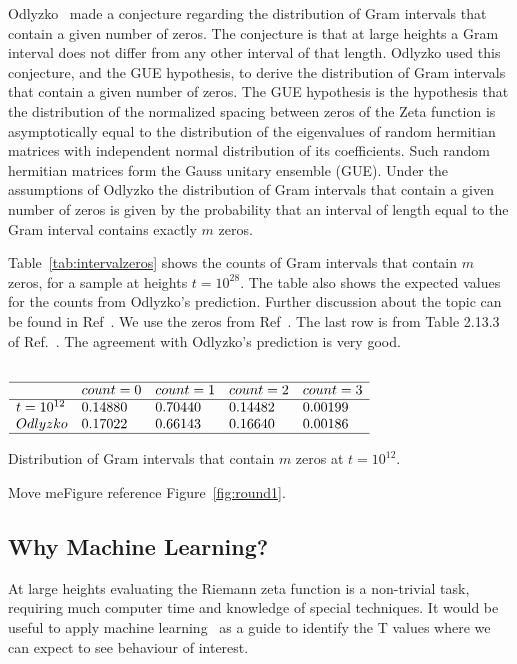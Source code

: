 \documentclass[twoside]{article}
\begin{document}
 Odlyzko~\cite{Odlyzko 1992} made a conjecture regarding the distribution of Gram intervals that contain a given number of zeros. The conjecture is that at large heights a Gram interval does not differ from any other interval of that length. Odlyzko used this conjecture, and the GUE hypothesis, to derive the distribution of Gram intervals that contain a given number of zeros.  
The GUE hypothesis  is the hypothesis that the distribution of the normalized spacing between zeros of the Zeta function is asymptotically equal to the distribution of the eigenvalues of random hermitian matrices with independent normal distribution of its coefficients. Such random hermitian matrices form the Gauss unitary ensemble (GUE). Under the assumptions of Odlyzko the distribution of Gram intervals that contain a given number of zeros is given by the probability that an interval of length equal to the Gram interval contains exactly $m$ zeros. 

Table~\ref{tab:intervalzeros} shows the counts of Gram intervals that contain $m$ zeros, for a sample at heights  $t=10^{28}$. The table also shows the  expected values for the counts from Odlyzko's prediction. Further discussion about the topic can be found in Ref~\cite{Shanker 2018a}. We use the zeros from Ref~\cite{hiary 2010}. The last row is from Table 2.13.3 of Ref.~\cite{Odlyzko 1992}. The agreement with Odlyzko's prediction is very good. 


\begin{table}
\centering \(\begin{array}{lllll}\\
\hline
 &count = 0&count = 1&count = 2&count = 3\\
\hline
t = 10^{12}&0.14880&0.70440&0.14482&0.00199\\
Odlyzko&0.17022&0.66143&0.16640&0.00186\\
\hline
\end{array}\)
\caption{Distribution of Gram intervals that contain $m$ zeros at  $t=10^{12}$.} 
\label{tab:intervalzeros}
\end{table}



Move meFigure reference Figure~\ref{fig:round1}.

\subsection{\label{secwhy}Why Machine Learning?}

At large heights evaluating the Riemann zeta function  is a non-trivial task, requiring much computer time 
and knowledge of special techniques.  It would be useful to apply
machine learning~\cite{osneural,Shanker 2018a}
as a guide to identify the T values where we can expect to see behaviour of interest.
\end{document}
